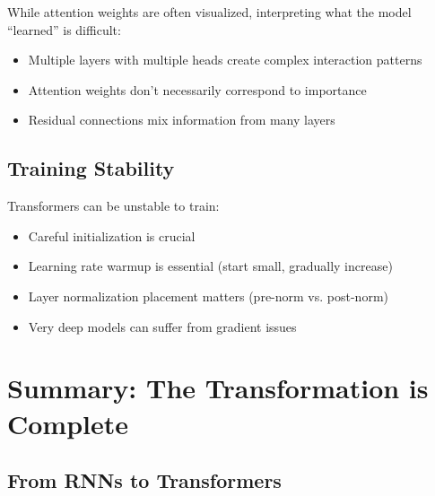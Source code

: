 \documentclass{article}
\begin{document}
While attention weights are often visualized, interpreting what the model ``learned'' is difficult:
\begin{itemize}
\item Multiple layers with multiple heads create complex interaction patterns
\item Attention weights don't necessarily correspond to importance
\item Residual connections mix information from many layers
\end{itemize}

\subsection{Training Stability}

Transformers can be unstable to train:
\begin{itemize}
\item Careful initialization is crucial
\item Learning rate warmup is essential (start small, gradually increase)
\item Layer normalization placement matters (pre-norm vs. post-norm)
\item Very deep models can suffer from gradient issues
\end{itemize}

\section{Summary: The Transformation is Complete}

\subsection{From RNNs to Transformers}

\begin{center}
\end{center}
\end{document}
